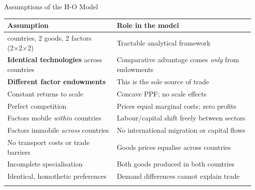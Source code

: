 \documentclass[
  ignorenonframetext,
  aspectratio=169,
]{beamer}
\makeatletter
\let\quarto@originallabel\label
\DeclareRobustCommand*{\label}[1]{\quarto@originallabel{#1}}
\makeatother
\begin{document}
\begin{frame}{Assumptions of the H-O Model}
\label{assumptions-of-the-h-o-model}
\begin{longtable}[]{@{}
  >{\raggedright\arraybackslash}p{}
  >{\raggedright\arraybackslash}p{}@{}}
\toprule\noalign{}
\begin{minipage}[b]{\linewidth}\raggedright
Assumption
\end{minipage} & \begin{minipage}[b]{\linewidth}\raggedright
Role in the model
\end{minipage} \\
\midrule\noalign{}
\endhead
2 countries, 2 goods, 2 factors (2×2×2) & Tractable analytical
framework \\
\textbf{Identical technologies} across countries & Comparative advantage
comes \emph{only} from endowments \\
\textbf{Different factor endowments} & This is the sole source of
trade \\
Constant returns to scale & Concave PPF; no scale effects \\
Perfect competition & Prices equal marginal costs; zero profits \\
Factors mobile \emph{within} countries & Labour/capital shift freely
between sectors \\
Factors immobile \emph{across} countries & No international migration or
capital flows \\
No transport costs or trade barriers & Goods prices equalise across
countries \\
Incomplete specialisation & Both goods produced in both countries \\
Identical, homothetic preferences & Demand differences cannot explain
trade \\
\bottomrule\noalign{}
\end{longtable}
\end{frame}
\end{document}
